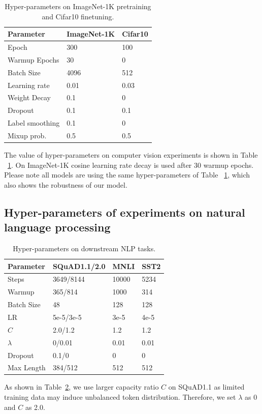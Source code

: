 \documentclass[letterpaper]{article} %
\begin{document}
\begin{table}[ht]
\centering
\caption{Hyper-parameters on ImageNet-1K pretraining and Cifar10 finetuning.}
\label{tbl-hyper-parameter-pretrain}
\begin{tabular}{l|l l}
\toprule
Parameter                  & ImageNet-1K  & Cifar10   \\ \midrule
Epoch                     & 300     & 100     \\
Warmup Epochs             & 30    & 0       \\
Batch Size                & 4096  & 512      \\
Learning rate             & 0.01  & 0.03  \\
Weight Decay              & 0.1   & 0  \\
Dropout                   & 0.1   & 0.1    \\ 
Label smoothing           & 0.1    & 0     \\
Mixup prob.               & 0.5   & 0.5     \\
\bottomrule
\end{tabular}
\end{table}

The value of hyper-parameters on computer vision experiments is shown in Table ~\ref{tbl-hyper-parameter-pretrain}. On ImageNet-1K cosine learning rate decay is used after 30 warmup epochs. Please note all models are using the same hyper-parameters of Table ~\ref{tbl-hyper-parameter-pretrain}, which also shows the robustness of our model. 

\subsection{Hyper-parameters of experiments on natural language processing}
\label{appendix:nlp-hyper}


\begin{table}[ht]
\centering
\caption{Hyper-parameters on downstream NLP tasks.}
\label{tbl-hyper-parameter-nlp-pretrain}
\begin{tabular}{l|l l l}
\toprule
Parameter                  & SQuAD1.1/2.0 & MNLI & SST2  \\ \midrule
Steps                     & 3649/8144 & 10000 & 5234     \\
Warmup              & 365/814   & 1000 & 314     \\
Batch Size                & 48 & 128 & 128     \\
LR             & 5e-5/3e-5 & 3e-5 & 4e-5  \\
$C$              & 2.0/1.2  & 1.2 & 1.2 \\
$\lambda$                   & 0/0.01  & 0.01 & 0.01  \\ 
Dropout           & 0.1/0   & 0  & 0   \\
Max Length               & 384/512  & 512 & 512  \\
\bottomrule
\end{tabular}
\end{table}

As shown in Table~\ref{tbl-hyper-parameter-nlp-pretrain}, we use larger capacity ratio $C$ on SQuAD1.1 as limited training data may induce unbalanced token distribution. Therefore, we set $\lambda$ as 0 and $C$ as 2.0. 
\end{document}
